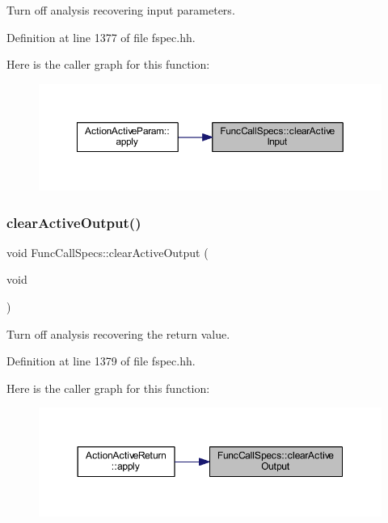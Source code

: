 Turn off analysis recovering input parameters. 



Definition at line 1377 of file fspec.\+hh.

Here is the caller graph for this function\+:
\nopagebreak
\begin{figure}[H]
\begin{center}
\leavevmode
\includegraphics[width=350pt]{class_func_call_specs_af24a93644abe9ee56a9aa86ba4cb0c9f_icgraph}
\end{center}
\end{figure}
\mbox{\label{class_func_call_specs_a5c13854db24718357b5ce7de7802b4ed}} 
\subsubsection{\texorpdfstring{clearActiveOutput()}{clearActiveOutput()}}
{\footnotesize\ttfamily void Func\+Call\+Specs\+::clear\+Active\+Output (\begin{DoxyParamCaption}\item[{void}]{ }\end{DoxyParamCaption})\hspace{0.3cm}{\ttfamily [inline]}}



Turn off analysis recovering the return value. 



Definition at line 1379 of file fspec.\+hh.

Here is the caller graph for this function\+:
\nopagebreak
\begin{figure}[H]
\begin{center}
\leavevmode
\includegraphics[width=350pt]{class_func_call_specs_a5c13854db24718357b5ce7de7802b4ed_icgraph}
\end{center}
\end{figure}
\mbox{\label{class_func_call_specs_a571062bec4389e2602577b6eed10cbf5}} 
